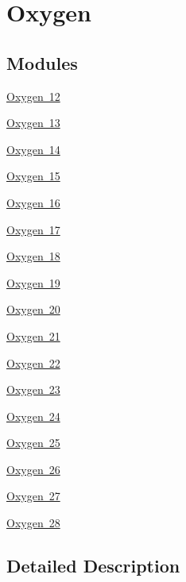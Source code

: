 \hypertarget{group___isotope_const-_oxygen}{}\section{Oxygen}
\label{group___isotope_const-_oxygen}
\subsection*{Modules}
\begin{DoxyCompactItemize}
\item 
\mbox{\hyperlink{group___isotope_const-_oxygen-_o12}{Oxygen 12}}
\item 
\mbox{\hyperlink{group___isotope_const-_oxygen-_o13}{Oxygen 13}}
\item 
\mbox{\hyperlink{group___isotope_const-_oxygen-_o14}{Oxygen 14}}
\item 
\mbox{\hyperlink{group___isotope_const-_oxygen-_o15}{Oxygen 15}}
\item 
\mbox{\hyperlink{group___isotope_const-_oxygen-_o16}{Oxygen 16}}
\item 
\mbox{\hyperlink{group___isotope_const-_oxygen-_o17}{Oxygen 17}}
\item 
\mbox{\hyperlink{group___isotope_const-_oxygen-_o18}{Oxygen 18}}
\item 
\mbox{\hyperlink{group___isotope_const-_oxygen-_o19}{Oxygen 19}}
\item 
\mbox{\hyperlink{group___isotope_const-_oxygen-_o20}{Oxygen 20}}
\item 
\mbox{\hyperlink{group___isotope_const-_oxygen-_o21}{Oxygen 21}}
\item 
\mbox{\hyperlink{group___isotope_const-_oxygen-_o22}{Oxygen 22}}
\item 
\mbox{\hyperlink{group___isotope_const-_oxygen-_o23}{Oxygen 23}}
\item 
\mbox{\hyperlink{group___isotope_const-_oxygen-_o24}{Oxygen 24}}
\item 
\mbox{\hyperlink{group___isotope_const-_oxygen-_o25}{Oxygen 25}}
\item 
\mbox{\hyperlink{group___isotope_const-_oxygen-_o26}{Oxygen 26}}
\item 
\mbox{\hyperlink{group___isotope_const-_oxygen-_o27}{Oxygen 27}}
\item 
\mbox{\hyperlink{group___isotope_const-_oxygen-_o28}{Oxygen 28}}
\end{DoxyCompactItemize}


\subsection{Detailed Description}
